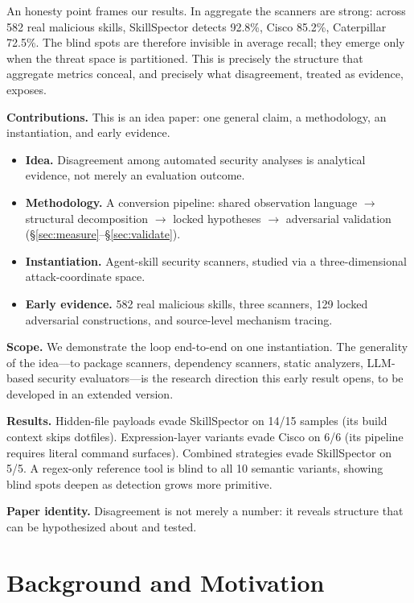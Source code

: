 \documentclass[sigconf,nonacm]{acmart}
\begin{document}
An honesty point frames our results.
In aggregate the scanners are strong: across 582 real malicious skills, SkillSpector detects 92.8\%, Cisco 85.2\%, Caterpillar 72.5\%.
The blind spots are therefore invisible in average recall; they emerge only when the threat space is partitioned.
This is precisely the structure that aggregate metrics conceal, and precisely what disagreement, treated as evidence, exposes.

\noindent\textbf{Contributions.} This is an idea paper: one general claim, a methodology, an instantiation, and early evidence.
\begin{itemize}
  \item \textbf{Idea.} Disagreement among automated security analyses is analytical evidence, not merely an evaluation outcome.
  \item \textbf{Methodology.} A conversion pipeline: shared observation language $\rightarrow$ structural decomposition $\rightarrow$ locked hypotheses $\rightarrow$ adversarial validation (\S\ref{sec:measure}--\S\ref{sec:validate}).
  \item \textbf{Instantiation.} Agent-skill security scanners, studied via a three-dimensional attack-coordinate space.
  \item \textbf{Early evidence.} 582 real malicious skills, three scanners, 129 locked adversarial constructions, and source-level mechanism tracing.
\end{itemize}

\noindent\textbf{Scope.} We demonstrate the loop end-to-end on one instantiation.
The generality of the idea---to package scanners, dependency scanners, static analyzers, LLM-based security evaluators---is the research direction this early result opens, to be developed in an extended version.

\noindent\textbf{Results.} Hidden-file payloads evade SkillSpector on 14/15 samples (its build context skips dotfiles). Expression-layer variants evade Cisco on 6/6 (its pipeline requires literal command surfaces). Combined strategies evade SkillSpector on 5/5.
A regex-only reference tool is blind to all 10 semantic variants, showing blind spots deepen as detection grows more primitive.

\noindent\textbf{Paper identity.} Disagreement is not merely a number: it reveals structure that can be hypothesized about and tested.

\section{Background and Motivation}
\label{sec:background}
\end{document}
